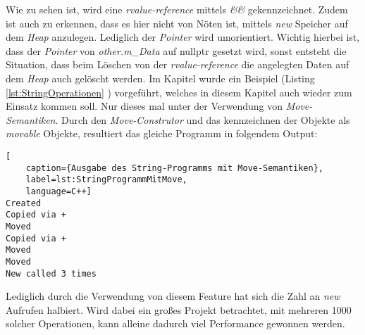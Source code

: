 Wie zu sehen ist, wird eine \emph{rvalue-reference} mittels \emph{\&\&} gekennzeichnet. Zudem ist
auch zu erkennen, dass es hier nicht von Nöten ist, mittels \emph{new} Speicher auf dem \emph{Heap}
anzulegen. Lediglich der \emph{Pointer} wird umorientiert. Wichtig hierbei ist, dass der
\emph{Pointer} von \emph{other.m\_Data} auf nullptr gesetzt wird, sonst entsteht die
Situation, dass beim Löschen von der \emph{rvalue-reference} die angelegten Daten auf dem
\emph{Heap} auch gelöscht werden.
\newline
\newline
Im Kapitel \emph{} wurde ein Beispiel (Listing \ref{lst:StringOperationen}
\emph{}) vorgeführt, welches in diesem Kapitel auch wieder zum
Einsatz kommen soll. Nur dieses mal unter der Verwendung von \emph{Move-Semantiken}. Durch den
\emph{Move-Construtor} und das kennzeichnen der Objekte als \emph{movable} Objekte, resultiert
das gleiche Programm in folgendem Output:

\begin{lstlisting}[
    caption={Ausgabe des String-Programms mit Move-Semantiken},
    label=lst:StringProgrammMitMove,
    language=C++]
Created
Copied via +
Moved
Copied via +
Moved
Moved
New called 3 times
\end{lstlisting}

Lediglich durch die Verwendung von diesem Feature hat sich die Zahl an \emph{new} Aufrufen halbiert.
Wird dabei ein großes Projekt betrachtet, mit mehreren 1000 solcher Operationen, kann alleine
dadurch viel Performance gewonnen werden.